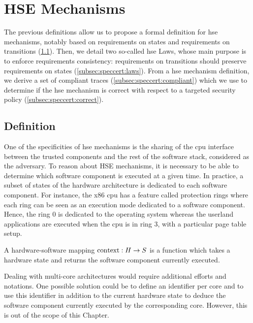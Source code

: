 \section{HSE Mechanisms}
\label{sec:speccert:hse}

The previous definitions allow us to propose a formal definition for \ac{hse}
mechanisms, notably based on requirements on states and requirements on
transitions (\ref{subsec:speccert:hsedef}).
%
Then, we detail two so-called \ac{hse} Laws, whose main purpose is to enforce
requirements consistency: requirements on transitions should preserve
requirements on states (\ref{subsec:speccert:laws}).
%
From a \ac{hse} mechanism definition, we derive a set of compliant traces
(\ref{subsec:speccert:compliant}) which we use to determine if the \ac{hse}
mechanism is correct with respect to a targeted security policy
(\ref{subsec:speccert:correct}).

\subsection{Definition}
\label{subsec:speccert:hsedef}

One of the specificities of \ac{hse} mechanisms is the sharing of the \ac{cpu}
interface between the trusted components and the rest of the software stack,
considered as the adversary.
%
To reason about HSE mechanisms, it is necessary to be able to determine which
software component is executed at a given time.
%
In practice, a subset of states of the hardware architecture is dedicated to
each software component.
%
For instance, the x86 \ac{cpu} has a feature called protection rings where each
ring can be seen as an execution mode dedicated to a software component.
%
Hence, the ring 0 is dedicated to the operating system whereas the userland
applications are executed when the \ac{cpu} is in ring 3, with a particular page
table setup.

\begin{definition}
  \label{def:hardsoftmap}
  A hardware-software mapping $\mathrm{con\-text} : H \rightarrow S$ is a function
  which takes a hardware state and returns the software component currently
  executed.
\end{definition}

Dealing with multi-core architectures would require additional efforts and
notations.
%
One possible solution could be to define an identifier per core and to use this
identifier in addition to the current hardware state to deduce the software
component currently executed by the corresponding core.
%
However, this is out of the scope of this Chapter.

